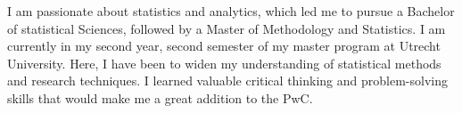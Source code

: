 


I am passionate about statistics and analytics, which led me to pursue a Bachelor of statistical Sciences, followed by a Master of Methodology and Statistics. I am currently in my second year, second semester of my master program at Utrecht University. Here, I have been to widen my understanding of statistical methods and research techniques. I learned valuable critical thinking and problem-solving skills that would make me a great addition to the PwC.